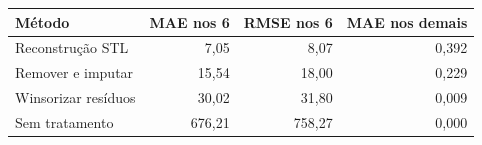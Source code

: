 \begin{tabular}{lrrr}
\toprule
Método & MAE nos 6 & RMSE nos 6 & MAE nos demais \\
\midrule
Reconstrução STL & 7,05 & 8,07 & 0,392 \\
Remover e imputar & 15,54 & 18,00 & 0,229 \\
Winsorizar resíduos & 30,02 & 31,80 & 0,009 \\
Sem tratamento & 676,21 & 758,27 & 0,000 \\
\bottomrule
\end{tabular}
